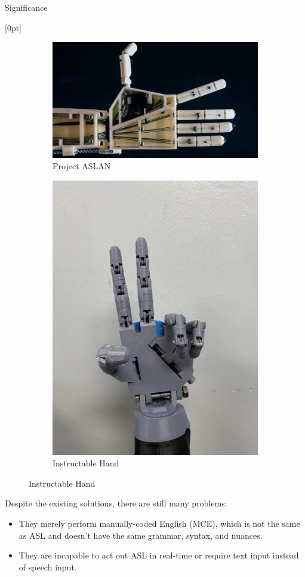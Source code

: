 \documentclass[final, 20pt]{beamer}
\newlength{\colwidth}
\newlength{\twocolwidth}
\begin{document}
\begin{frame}[t]
\begin{columns}[t]
\begin{column}{\twocolwidth}
\begin{block}{Significance}
\begin{minipage}[t]{0.48\linewidth}
[0pt]
\begin{figure}[ht]
  \centering
  \begin{subfigure}[b]{0.45\linewidth}
    \centering
    \includegraphics[width=\linewidth]{images/aslan.png}
    \caption{Project ASLAN}
    \label{fig:aslan}
  \end{subfigure}
  \begin{subfigure}[b]{0.45\linewidth}
    \centering
    \includegraphics[width=0.425\linewidth]{images/instructable-hand.png}
    \caption{Instructable Hand}
    \label{fig:instructable-hand}
  \end{subfigure}
\end{figure}
\vspace{-1em}

Despite the existing solutions, there are still many problems:

\begin{itemize}
  \item They merely perform manually-coded English (MCE), which is not the same as ASL and doesn't have the same grammar, syntax, and nuances.
  \item They are incapable to act out ASL in real-time or require text input instead of speech input.
\end{itemize}


\end{minipage}
\end{block}
\end{column}
\end{columns}
\end{frame}
\end{document}
